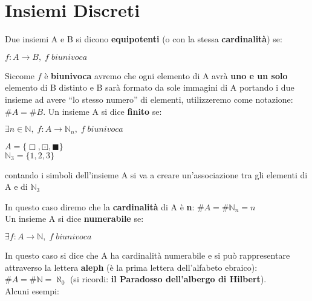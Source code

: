 \section{Insiemi Discreti}
Due insiemi A e B si dicono \textbf{equipotenti} (o con la stessa \textbf{cardinalità}) se:
\begin{center}
    $f : A \rightarrow B, \; f \; biunivoca$
\end{center}
Siccome $f$ è \textbf{biunivoca} avremo che ogni elemento di A avrà \textbf{uno e un solo} elemento di B distinto e B sarà formato da sole immagini di A portando i due insieme ad avere ``lo stesso numero'' di elementi, utilizzeremo come notazione: $\#A = \#B$.
Un insieme A si dice \textbf{finito} se:
\begin{center}
    $\exists n \in \mathbb{N}, \; f : A \rightarrow \mathbb{N}_n, \; f \; biunivoca$
\end{center}
\begin{boxA}
    \begin{minipage}[t]{0.3\textwidth}
        \centering
        $A = \{ \Box, \boxdot, \blacksquare \}$ \\
        $\mathbb{N}_3 = \{1, 2, 3 \}$
    \end{minipage}
    \begin{minipage}[t]{0.6\textwidth}
        \centering
        contando i simboli dell'insieme A si va a creare un'associazione tra gli elementi di A e di $\mathbb{N}_3$
    \end{minipage}
\end{boxA}
In questo caso diremo che la \textbf{cardinalità} di A è \textbf{n}: $\#A = \#\mathbb{N}_n = n$ \\
Un insieme A si dice \textbf{numerabile} se:
\begin{center}
    $\exists f : A \rightarrow \mathbb{N}, \; f \; biunivoca$
\end{center}
In questo caso si dice che A ha cardinalità numerabile e si può rappresentare attraverso la lettera \textbf{aleph} (è la prima lettera dell'alfabeto ebraico): $\#A = \#\mathbb{N} = \aleph_0$ (si ricordi: \textbf{il Paradosso dell'albergo di Hilbert}). \\
Alcuni esempi: 
